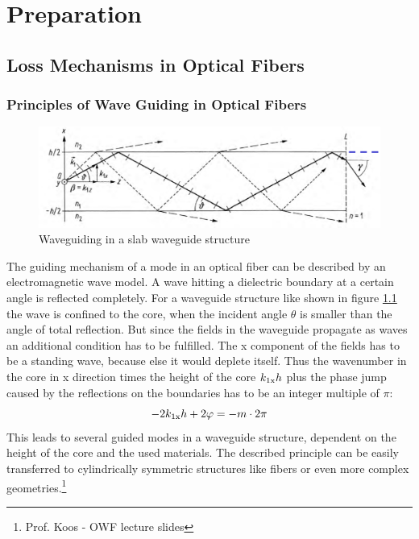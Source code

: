 \chapter{Preparation}
\section{Loss Mechanisms in Optical Fibers}

\subsection{Principles of Wave Guiding in Optical Fibers}

\begin{figure}%
\centering
\includegraphics[width=.75\columnwidth]{grafiken/slab1.png}%
\caption{Waveguiding in a slab waveguide structure}%
\label{fig:slab1}%
\end{figure}

The guiding mechanism of a mode in an optical fiber can be described by an electromagnetic wave model. A wave hitting a dielectric boundary at a certain angle is reflected completely. For a waveguide structure like shown in figure \ref{fig:slab1} the wave is confined to the core, when the incident angle $\theta$ is smaller than the angle of total reflection. But since the fields in the waveguide propagate as waves an additional condition has to be fulfilled. The x component of the fields has to be a standing wave, because else it would deplete itself. Thus the wavenumber in the core in x direction times the height of the core $k_{\mathrm{1x}}h$ plus the phase jump caused by the reflections on the boundaries has to be an integer multiple of $\pi$:
\begin{equation}
 -2k_{\mathrm{1x}}h+2\varphi = -m\cdot2\pi
\end{equation}
This leads to several guided modes in a waveguide structure, dependent on the height of the core and the used materials. The described principle can be easily transferred to cylindrically symmetric structures like fibers or even more complex geometries.\footnote[1]{Prof. Koos - OWF lecture slides}

